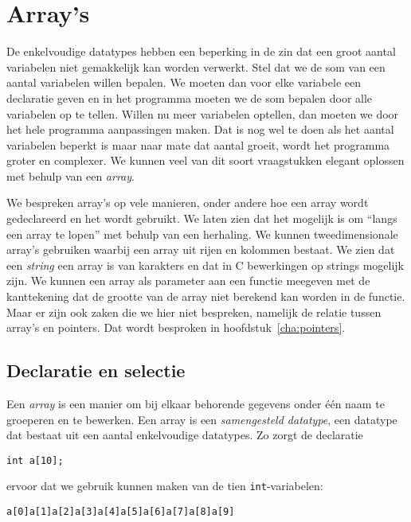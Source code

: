 \chapter{Array's}
\label{cha:arrays}
\thispagestyle{empty}

De enkelvoudige datatypes hebben een beperking in de zin dat een groot aantal variabelen niet gemakkelijk kan worden verwerkt. Stel dat we de som van een aantal variabelen willen bepalen. We moeten dan voor elke variabele een declaratie geven en in het programma moeten we de som bepalen door alle variabelen op te tellen. Willen nu meer variabelen optellen, dan moeten we door het hele programma aanpassingen maken. Dat is nog wel te doen als het aantal variabelen beperkt is maar naar mate dat aantal groeit, wordt het programma groter en complexer. We kunnen veel van dit soort vraagstukken elegant oplossen met behulp van een \textsl{array}.

We bespreken array's op vele manieren, onder andere hoe een array wordt gedeclareerd en het wordt gebruikt. We laten zien dat het mogelijk is om ``langs een array te lopen'' met behulp van een herhaling. We kunnen tweedimensionale array's gebruiken waarbij een array uit rijen en kolommen bestaat. We zien dat een \textsl{string} een array is van karakters en dat in C bewerkingen op strings mogelijk zijn. We kunnen een array als parameter aan een functie meegeven met de kanttekening dat de grootte van de array niet berekend kan worden in de functie. Maar er zijn ook zaken die we hier niet bespreken, namelijk de relatie tussen array's en pointers. Dat wordt besproken in hoofdstuk~\ref{cha:pointers}.

\section{Declaratie en selectie}
Een \textsl{array} is een manier om bij elkaar behorende gegevens onder één naam te groeperen en te bewerken. Een array is een \textsl{samengesteld datatype}, een datatype dat bestaat uit een aantal enkelvoudige datatypes.
Zo zorgt de declaratie

\hspace*{1em}\texttt{int a[10];}

ervoor dat we gebruik kunnen maken van de tien \texttt{int}-variabelen:

\hspace*{1em}\texttt{a[0]}\quad\texttt{a[1]}\quad\texttt{a[2]}\quad\texttt{a[3]}\quad\texttt{a[4]}\quad\texttt{a[5]}\quad\texttt{a[6]}\quad\texttt{a[7]}\quad\texttt{a[8]}\quad\texttt{a[9]}

